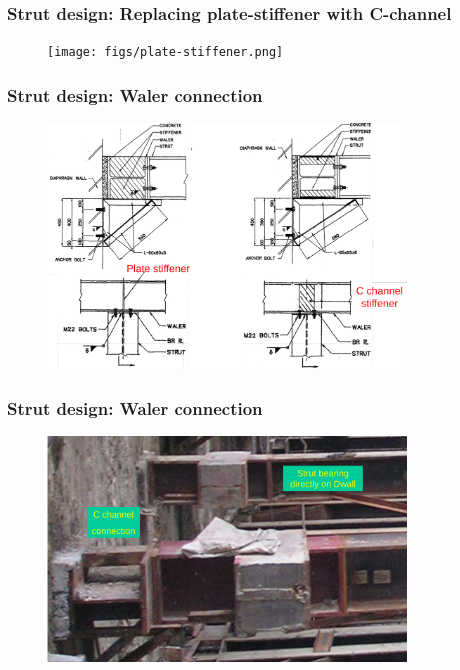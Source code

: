 \documentclass[notes]{beamer}
\begin{document}

\begin{frame}
\frametitle{Strut design: Replacing plate-stiffener with C-channel}
\begin{figure}[ht]
	\centering
	\texttt{[image: figs/plate-stiffener.png]}
\end{figure}
\end{frame}

\begin{frame}
\frametitle{Strut design: Waler connection}
\begin{figure}[ht]
	\centering
	\includegraphics[width=0.85\textwidth]{figs/plate-stiffeners-strut-waler.png}
\end{figure}
\end{frame}

\begin{frame}
\frametitle{Strut design: Waler connection}
\begin{figure}[ht]
	\centering
	\includegraphics[width=0.85\textwidth]{figs/c-channel-strut-dwall.png}
\end{figure}
\end{frame}
\end{document}

